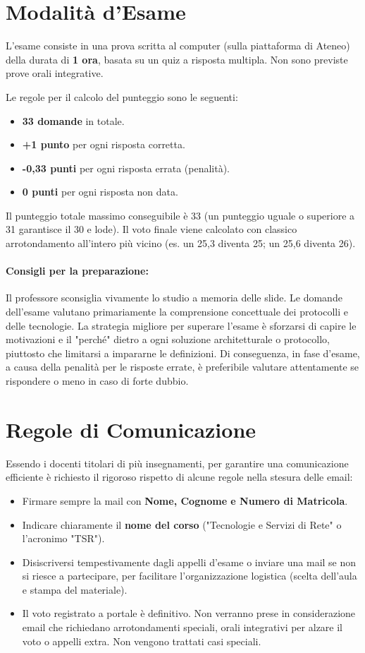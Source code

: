\section{Modalità d'Esame}
L'esame consiste in una prova scritta al computer (sulla piattaforma di Ateneo) della durata di \textbf{1 ora}, basata su un quiz a risposta multipla. Non sono previste prove orali integrative.

Le regole per il calcolo del punteggio sono le seguenti:
\begin{itemize}
    \item \textbf{33 domande} in totale.
    \item \textbf{+1 punto} per ogni risposta corretta.
    \item \textbf{-0,33 punti} per ogni risposta errata (penalità).
    \item \textbf{0 punti} per ogni risposta non data.
\end{itemize}
Il punteggio totale massimo conseguibile è 33 (un punteggio uguale o superiore a 31 garantisce il 30 e lode). Il voto finale viene calcolato con classico arrotondamento all'intero più vicino (es. un 25,3 diventa 25; un 25,6 diventa 26).

\paragraph{Consigli per la preparazione:} Il professore sconsiglia vivamente lo studio a memoria delle slide. Le domande dell'esame valutano primariamente la comprensione concettuale dei protocolli e delle tecnologie. La strategia migliore per superare l'esame è sforzarsi di capire le motivazioni e il "perché" dietro a ogni soluzione architetturale o protocollo, piuttosto che limitarsi a impararne le definizioni. Di conseguenza, in fase d'esame, a causa della penalità per le risposte errate, è preferibile valutare attentamente se rispondere o meno in caso di forte dubbio.

\section{Regole di Comunicazione}
Essendo i docenti titolari di più insegnamenti, per garantire una comunicazione efficiente è richiesto il rigoroso rispetto di alcune regole nella stesura delle email:
\begin{itemize}
    \item Firmare sempre la mail con \textbf{Nome, Cognome e Numero di Matricola}.
    \item Indicare chiaramente il \textbf{nome del corso} ("Tecnologie e Servizi di Rete" o l'acronimo "TSR").
    \item Disiscriversi tempestivamente dagli appelli d'esame o inviare una mail se non si riesce a partecipare, per facilitare l'organizzazione logistica (scelta dell'aula e stampa del materiale).
    \item Il voto registrato a portale è definitivo. Non verranno prese in considerazione email che richiedano arrotondamenti speciali, orali integrativi per alzare il voto o appelli extra. Non vengono trattati casi speciali.
\end{itemize}